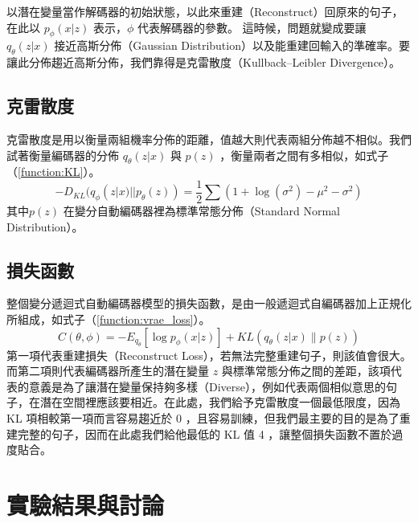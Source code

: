 以潛在變量當作解碼器的初始狀態，以此來重建（Reconstruct）回原來的句子，在此以 $p_\phi(x|z)$ 表示，$\phi$ 代表解碼器的參數。
這時候，問題就變成要讓 $q_\theta(z|x)$ 接近高斯分佈（Gaussian Distribution）以及能重建回輸入的準確率。要讓此分佈趨近高斯分佈，我們靠得是克雷散度（Kullback–Leibler Divergence）。
\subsection{克雷散度}
克雷散度是用以衡量兩組機率分佈的距離，值越大則代表兩組分佈越不相似。我們試著衡量編碼器的分佈 $q_\theta(z|x)$ 與 $p(z)$ ，衡量兩者之間有多相似，如式子（\ref{function:KL}）。
\begin{equation}
    -D_{KL}(q_\phi(z|x)|| p_\theta(z) ) = \frac{1}{2} \sum(1+\log(\sigma^2) - \mu^2 - \sigma^2)
    \label{function:KL}
\end{equation}
其中$p(z)$ 在變分自動編碼器裡為標準常態分佈（Standard Normal Distribution）。
\subsection{損失函數}
整個變分遞迴式自動編碼器模型的損失函數，是由一般遞迴式自編碼器加上正規化所組成，如式子（\ref{function:vrae_loss}）。
\begin{equation}
    C(\theta, \phi) = -E_{q_{\theta}}[\log p_\phi(x|z)] + KL(q_\theta(z|x) \| p(z))
    \label{function:vrae_loss}
\end{equation}
第一項代表重建損失（Reconstruct Loss），若無法完整重建句子，則該值會很大。
而第二項則代表編碼器所產生的潛在變量 $z$ 與標準常態分佈之間的差距，該項代表的意義是為了讓潛在變量保持夠多樣（Diverse），例如代表兩個相似意思的句子，在潛在空間裡應該要相近。在此處，我們給予克雷散度一個最低限度，因為 KL 項相較第一項而言容易趨近於 0 ，且容易訓練，但我們最主要的目的是為了重建完整的句子，因而在此處我們給他最低的 KL 值 4 ，讓整個損失函數不置於過度貼合。

\section{實驗結果與討論}
